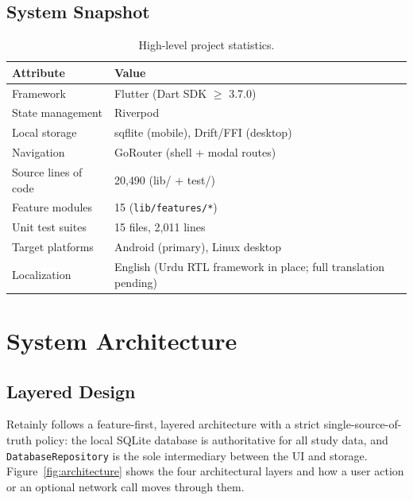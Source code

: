 \documentclass[11pt,a4paper]{article}
\begin{document}
\subsection{System Snapshot}
\begin{table}[h!]
\centering
\begin{tabular}{ll}
\toprule
\textbf{Attribute} & \textbf{Value} \\
\midrule
Framework & Flutter (Dart SDK $\geq$ 3.7.0) \\
State management & Riverpod \\
Local storage & sqflite (mobile), Drift/FFI (desktop) \\
Navigation & GoRouter (shell + modal routes) \\
Source lines of code & 20{,}490 (lib/ + test/) \\
Feature modules & 15 (\texttt{lib/features/*}) \\
Unit test suites & 15 files, 2{,}011 lines \\
Target platforms & Android (primary), Linux desktop \\
Localization & English (Urdu RTL framework in place; full translation pending) \\
\bottomrule
\end{tabular}
\caption{High-level project statistics.}
\end{table}

\section{System Architecture}

\subsection{Layered Design}
Retainly follows a feature-first, layered architecture with a strict single-source-of-truth policy: the local SQLite database is authoritative for all study data, and \texttt{DatabaseRepository} is the sole intermediary between the UI and storage. Figure~\ref{fig:architecture} shows the four architectural layers and how a user action or an optional network call moves through them.
\end{document}
